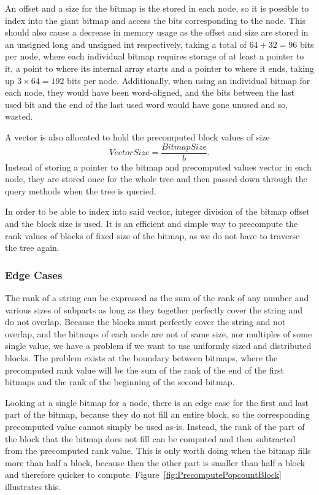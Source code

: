 An offset and a size for the bitmap is the stored in each node, so it is possible to index into the giant bitmap and access the bits corresponding to the node.
This should also cause a decrease in memory usage as the offset and size are stored in an unsigned long and unsigned int respectively, taking a total of $64+32=96$ bits per node, where each individual bitmap requires storage of at least a pointer to it, a point to where its internal array starts and a pointer to where it ends, taking up $3 \times 64=192$ bits per node.
Additionally, when using an individual bitmap for each node, they would have been word-aligned, and the bits between the last used bit and the end of the last used word would have gone unused and so, wasted.

A vector is also allocated to hold the precomputed block values of size
\[\mathit{VectorSize} = \frac{\mathit{BitmapSize}}{b}.\]
Instead of storing a pointer to the bitmap and precomputed values vector in each node, they are stored once for the whole tree and then passed down through the query methods when the tree is queried.

In order to be able to index into said vector, integer division of the bitmap offset and the block size is used. It is an efficient and simple way to precompute the rank values of blocks of fixed size of the bitmap, as we do not have to traverse the tree again.


\subsubsection{Edge Cases}
\label{sec:rankQueriesWithPrecomputedRanksEdgeCases}
The rank of a string can be expressed as the sum of the rank of any number and various sizes of subparts as long as they together perfectly cover the string and do not overlap.
Because the blocks must perfectly cover the string and not overlap, and the bitmaps of each node are not of same size, nor multiples of some single value, we have a problem if we want to use uniformly sized and distributed blocks.
The problem exists at the boundary between bitmaps, where the precomputed rank value will be the sum of the rank of the end of the first bitmaps and the rank of the beginning of the second bitmap.

Looking at a single bitmap for a node, there is an edge case for the first and last part of the bitmap, because they do not fill an entire block, so the corresponding precomputed value cannot simply be used as-is.
Instead, the rank of the part of the block that the bitmap does not fill can be computed and then subtracted from the precomputed rank value.
This is only worth doing when the bitmap fills more than half a block, because then the other part is smaller than half a block and therefore quicker to compute.
Figure~\ref{fig:PrecomputePopcountBlock} illustrates this.



